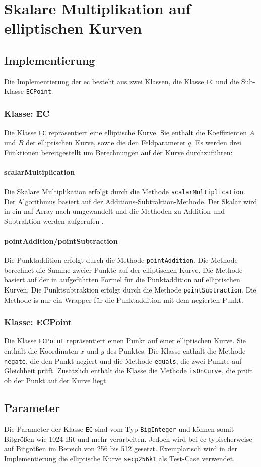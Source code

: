 \chapter{Skalare Multiplikation auf elliptischen Kurven}

\section{Implementierung}
Die Implementierung der \gls{ec} besteht aus zwei Klassen, die Klasse \texttt{EC} und die Sub-Klasse \texttt{ECPoint}.

\subsection{Klasse: EC}
Die Klasse \texttt{EC} repräsentiert eine elliptische Kurve. Sie enthält die Koeffizienten $A$ und $B$ der elliptischen Kurve, sowie die den Feldparameter $q$. Es werden drei Funktionen bereitgestellt um Berechnungen auf der Kurve durchzuführen:
\subsubsection{scalarMultiplication}
Die Skalare Multiplikation erfolgt durch die Methode \texttt{scalarMultiplication}. Der Algorithmus basiert auf der Additions-Subtraktion-Methode. Der Skalar wird in ein \gls{naf} Array nach \cite{enwiki:1153415896} umgewandelt und die Methoden zu Addition und Subtraktion werden aufgerufen \cite{891000}.

\subsubsection{pointAddition/pointSubtraction}
Die Punktaddition erfolgt durch die Methode \texttt{pointAddition}. Die Methode berechnet die Summe zweier Punkte auf der elliptischen Kurve. Die Methode basiert auf der in \cite{891000} aufgeführten Formel für die Punktaddition auf elliptischen Kurven. Die Punktsubtraktion erfolgt durch die Methode \texttt{pointSubtraction}. Die Methode is nur ein Wrapper für die Punktaddition mit dem negierten Punkt.

\subsection{Klasse: ECPoint}
Die Klasse \texttt{ECPoint} repräsentiert einen Punkt auf einer elliptischen Kurve. Sie enthält die Koordinaten $x$ und $y$ des Punktes. Die Klasse enthält die Methode \texttt{negate}, die den Punkt negiert und die Methode \texttt{equals}, die zwei Punkte auf Gleichheit prüft. Zusätzlich enthält die Klasse die Methode \texttt{isOnCurve}, die prüft ob der Punkt auf der Kurve liegt.

\section{Parameter}
Die Parameter der Klasse \texttt{EC} sind vom Typ \texttt{BigInteger} und können somit Bitgrößen wie 1024 Bit und mehr verarbeiten. Jedoch wird bei \gls{ec} typischerweise auf Bitgrößen im Bereich von 256 bis 512 gesetzt. Exemplarisch wird in der Implementierung die elliptische Kurve \texttt{secp256k1} als Test-Case verwendet.


